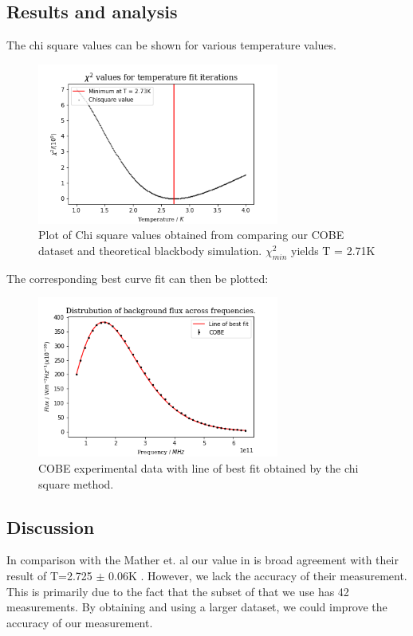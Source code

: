 \documentclass{article}%
\begin{document}
\subsection{Results and analysis}%
\label{subsec:Analysis}%
The chi square values can be shown for various temperature values. \par
\begin{figure}[H]%
\centering%
\includegraphics[width=300px]{task5_fig_b.png}%
\caption{Plot of Chi square values obtained from comparing our COBE dataset and theoretical blackbody simulation. $\chi^2_{min}$ yields T = 2.71K }%
\end{figure}
%
The corresponding best curve fit can then be plotted:
\begin{figure}[H]%
\centering%
\includegraphics[width=300px]{task5_fig_a.png}%
\caption{COBE experimental data with line of best fit obtained by the chi square method.}%
\end{figure}

%
\subsection{Discussion}%
\label{subsec:Discussion}%
In comparison with the Mather et. al our value in is broad agreement with their result of T=2.725 $\pm$ 0.06K \cite{Mather}.
However, we lack the accuracy of their measurement. This is primarily due to the fact that the subset of that we use has 42 measurements.
By obtaining and using a larger dataset, we could improve the accuracy of our measurement. \cite{github} \par
\end{document}
